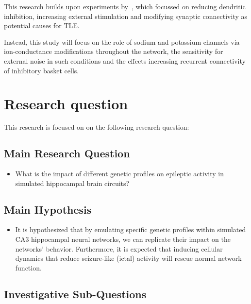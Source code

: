 This research builds upon experiments by~\textcite{sanjayImpairedDendriticInhibition2015}, 
which focussed on reducing dendritic inhibition, increasing external stimulation and modifying synaptic connectivity as potential causes for TLE\@.

Instead, this study will focus on the role of sodium and potassium channels via ion-conductance modifications throughout the network, 
the sensitivity for external noise in such conditions and the effects increasing recurrent connectivity of inhibitory basket cells.
\pagebreak
\section{Research question}
This research is focused on on the following research question:

\subsection*{Main Research Question}

\begin{itemize}
    \item What is the impact of different genetic profiles on epileptic activity in simulated hippocampal brain circuits?
\end{itemize}

\subsection*{Main Hypothesis}

\begin{itemize}
    \item It is hypothesized that by emulating specific genetic profiles within simulated CA3 hippocampal neural networks, 
    we can replicate their impact on the networks' behavior. Furthermore, it is expected that inducing cellular dynamics that 
    reduce seizure-like (ictal) activity will rescue normal network function.
\end{itemize}

\subsection*{Investigative Sub-Questions}

